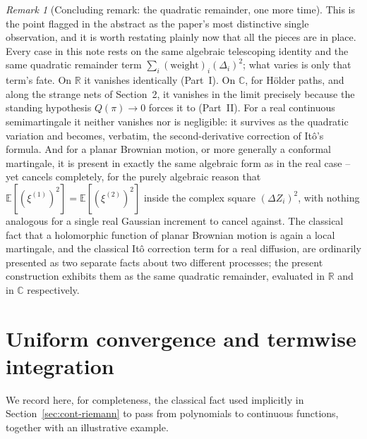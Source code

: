 \documentclass[11pt,fleqn]{article}
\def\C{\mathbb C}
\def\R{\mathbb R}
\def\E{\mathbb E}
\theoremstyle{plain}
\theoremstyle{remark}
\newtheorem{remark}[thm]{Remark}
\begin{document}
\begin{remark}[Concluding remark: the quadratic remainder, one more time]
This is the point flagged in the abstract as the paper's most
distinctive single observation, and it is worth restating plainly now
that all the pieces are in place. Every case in this note rests on the
same algebraic telescoping identity and the same quadratic remainder
term $\sum_i(\text{weight})_i(\Delta_i)^2$; what varies is only that
term's fate. On $\R$ it vanishes identically (Part~I). On $\C$, for
H\"older paths, and along the strange nets of Section~2, it vanishes in
the limit precisely because the standing hypothesis $Q(\pi)\to0$ forces
it to (Part~II). For a real continuous semimartingale it neither
vanishes nor is negligible: it survives as the quadratic variation and
becomes, verbatim, the second-derivative correction of It\^o's formula.
And for a planar Brownian motion, or more generally a conformal
martingale, it is present in exactly the same algebraic form as in the
real case -- yet cancels completely, for the purely algebraic reason
that $\E[(\xi^{(1)})^2]=\E[(\xi^{(2)})^2]$ inside the complex square
$(\Delta Z_i)^2$, with nothing analogous for a single real Gaussian
increment to cancel against. The classical fact that a holomorphic
function of planar Brownian motion is again a local martingale, and the
classical It\^o correction term for a real diffusion, are ordinarily
presented as two separate facts about two different processes; the
present construction exhibits them as the same quadratic remainder,
evaluated in $\R$ and in $\C$ respectively.
\end{remark}

\appendix
\section{Uniform convergence and termwise integration}

We record here, for completeness, the classical fact used implicitly in
Section~\ref{sec:cont-riemann} to pass from polynomials to continuous functions, together
with an illustrative example.
\end{document}
